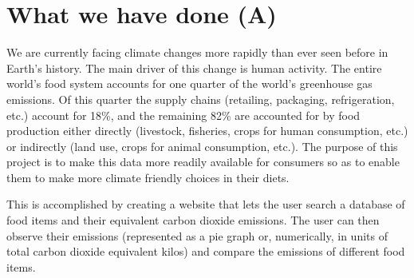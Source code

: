 \section{What we have done (A)}
We are currently facing climate changes more rapidly than ever seen before in Earth’s history. The main driver of this change is human activity. The entire world’s food system accounts for one quarter of the world's greenhouse gas emissions. Of this quarter the supply chains (retailing, packaging, refrigeration, etc.) account for 18\%, and the remaining 82\% are accounted for by food production either directly (livestock, fisheries, crops for human consumption, etc.) or indirectly (land use, crops for animal consumption, etc.)\cite{FoodStat}. The purpose of this project is to make this data more readily available for consumers so as to enable them to make more climate friendly choices in their diets. 

This is accomplished by creating a website that lets the user search a database of food items and their equivalent carbon dioxide emissions. The user can then observe their emissions (represented as a pie graph or, numerically, in units of total carbon dioxide equivalent kilos) and compare the emissions of different food items. 
